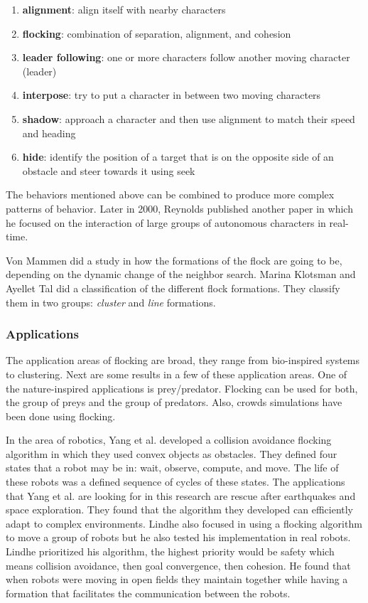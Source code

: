 \begin{enumerate}
\item \textbf{alignment}: align itself with nearby characters
\item \textbf{flocking}: combination of separation, alignment, and cohesion
\item \textbf{leader following}: one or more characters follow another moving character (leader)
\item \textbf{interpose}: try to put a character in between two moving characters
\item \textbf{shadow}: approach a character and then use alignment to match their speed and heading
\item \textbf{hide}: identify the position of a target that is on the opposite side of an obstacle and  steer towards it using seek
\end{enumerate} 
 
The behaviors mentioned above can be combined to produce more complex patterns of behavior. Later in 2000, Reynolds published another paper\cite{craigInteractionGroups} in which he focused on the interaction of large groups of autonomous characters in real-time. 

Von Mammen did a study in how the formations of the flock are going to be, depending on the dynamic change of the neighbor search\cite{spatialSwarms}. Marina Klotsman and Ayellet Tal  did a classification of the different flock formations\cite{lineFormations}. They classify them in two groups: \textit{cluster} and \textit{line} formations.

\subsubsection{Applications}
The application areas of flocking are broad, they range from bio-inspired systems to clustering. Next are some results in a few of these application areas. One of the nature-inspired applications is prey/predator. Flocking can be used for both, the group of preys and the group of predators\cite{gems2}. Also, crowds simulations have been done using flocking\cite{crowdsPS3}. 

In the area of robotics, Yang et al. developed a collision avoidance flocking algorithm in which they used convex objects as obstacles\cite{flockingRobots}. They defined four states that a robot may be in: wait, observe, compute, and move. The life of these robots was a defined sequence of cycles of these states. The applications that Yang et al. are looking for in this research are rescue after earthquakes and space exploration. They found that the algorithm they developed can efficiently adapt to complex environments. Lindhe also focused in using a flocking algorithm to move a group of robots but he also tested his implementation in real robots\cite{flockingRobotsThesis}. Lindhe prioritized his algorithm, the highest priority would be safety which means collision avoidance, then goal convergence, then cohesion. He found that when robots were moving in open fields they maintain together while having a formation that facilitates the communication between the robots. 


